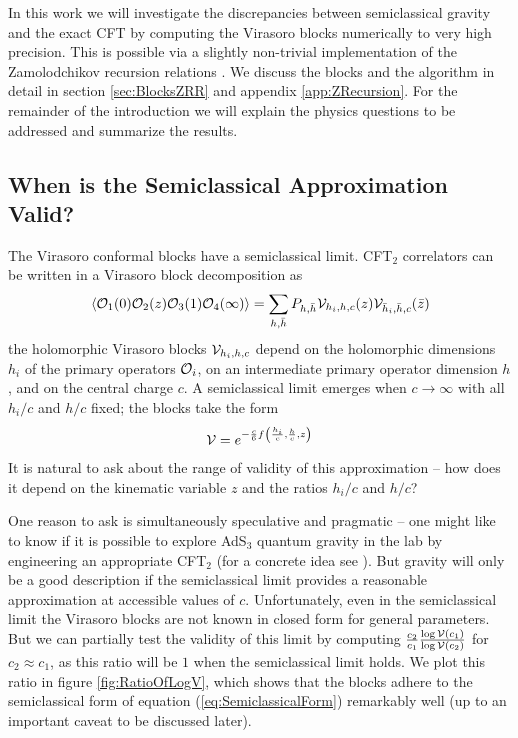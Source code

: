 \documentclass[12pt]{article}
\numberwithin{equation}{section}
\def\>{\rangle}
\def\<{\langle}
\newcommand{\be}{\begin{eqnarray}}
\newcommand{\ee}{\end{eqnarray}}
\newcommand{\CO}{{\cal O}}
\newcommand{\CV}{{\cal V}}
\begin{document}
In this work we will  investigate the discrepancies between semiclassical gravity and the exact CFT by computing the Virasoro blocks numerically to very high precision.  This is possible via a slightly non-trivial implementation of the Zamolodchikov recursion relations \cite{ZamolodchikovRecursion, Zamolodchikovq, Zamolodchikov:1986gh}.  We discuss the blocks and the algorithm in detail in section \ref{sec:BlocksZRR} and appendix \ref{app:ZRecursion}.  For the remainder of the introduction we will explain the physics questions to be addressed and summarize the results.


\subsection*{When is the Semiclassical Approximation Valid?}

The Virasoro conformal blocks have a semiclassical limit.  CFT$_2$ correlators can be written in a Virasoro block decomposition as
\be 
\< \CO_1(0)  \CO_2(z) \CO_3(1) \CO_4(\infty) \> = \sum_{h, \bar h} P_{h, \bar h} \CV_{h_i, h,c}(z) \CV_{\bar h_i, \bar h,c}(\bar z)
\ee
the holomorphic Virasoro blocks $\CV_{h_i,h,c}$ depend on the holomorphic dimensions $h_i$ of the primary operators $\CO_i$, on an intermediate primary operator dimension $h$, and on the central charge $c$.  A semiclassical limit emerges when $c \to \infty$ with all $h_i/ c$ and $h/c$ fixed; the blocks take the form 
\be \label{eq:SemiclassicalForm}
\CV = e^{-\frac{c}{6} f \left( \frac{h_i}{c},\frac{h}{c}, z \right)}  
\ee
It is natural to ask about the range of validity of this approximation -- how does it depend on the kinematic variable $z$ and the ratios $h_i/c$ and $h/c$?

One reason to ask is simultaneously speculative and pragmatic -- one might like to know if it is possible to explore AdS$_3$ quantum gravity in the lab by engineering an appropriate CFT$_2$  (for a concrete idea see \cite{Plamadeala:2014roa}).  But gravity will only be a good description if the semiclassical limit provides a reasonable approximation at accessible values of $c$.  Unfortunately, even in the semiclassical limit the Virasoro blocks are not known in closed form for general parameters.  But we can partially test the validity of this limit by computing $\frac{c_2}{c_1} \frac{\log \CV(c_1)}{\log \CV(c_2)}$ for $c_2 \approx c_1$, as this ratio will be $1$ when the semiclassical limit holds.  We plot this ratio in figure \ref{fig:RatioOfLogV}, which shows that the blocks adhere to the semiclassical form of equation (\ref{eq:SemiclassicalForm}) remarkably well (up to an important caveat to be discussed later).
\end{document}

